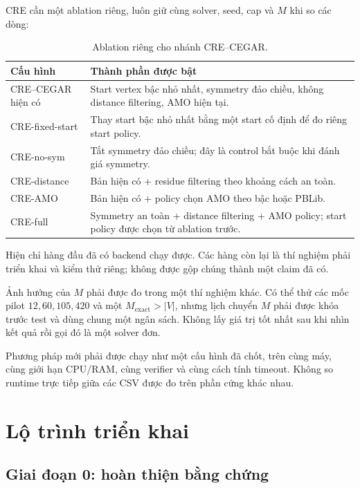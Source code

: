 \documentclass[11pt,a4paper,oneside]{scrreprt}
\begin{document}
\clearpage
CRE cần một ablation riêng, luôn giữ cùng solver, seed, cap và $M$ khi so các dòng:

\begin{table}[H]
\centering
\small
\begin{tabularx}{\textwidth}{p{31mm} X}
\toprule
Cấu hình & Thành phần được bật \\
\midrule
CRE--CEGAR hiện có & Start vertex bậc nhỏ nhất, symmetry đảo chiều, không distance filtering, AMO hiện tại. \\
CRE-fixed-start & Thay start bậc nhỏ nhất bằng một start cố định để đo riêng start policy. \\
CRE-no-sym & Tắt symmetry đảo chiều; đây là control bắt buộc khi đánh giá symmetry. \\
CRE-distance & Bản hiện có + residue filtering theo khoảng cách an toàn. \\
CRE-AMO & Bản hiện có + policy chọn AMO theo bậc hoặc PBLib. \\
CRE-full & Symmetry an toàn + distance filtering + AMO policy; start policy được chọn từ ablation trước. \\
\bottomrule
\end{tabularx}
\caption{Ablation riêng cho nhánh CRE--CEGAR.}
\end{table}

Hiện chỉ hàng đầu đã có backend chạy được. Các hàng còn lại là thí nghiệm phải triển khai và kiểm thử riêng; không được gộp chúng thành một claim đã có.

Ảnh hưởng của $M$ phải được đo trong một thí nghiệm khác. Có thể thử các mốc pilot $12,60,105,420$ và một $M_{\mathrm{exact}}>|V|$, nhưng lịch chuyển $M$ phải được khóa trước test và dùng chung một ngân sách. Không lấy giá trị tốt nhất sau khi nhìn kết quả rồi gọi đó là một solver đơn.

\begin{resultbox}
Phương pháp mới phải được chạy như một cấu hình đã chốt, trên cùng máy, cùng giới hạn CPU/RAM, cùng verifier và cùng cách tính timeout. Không so runtime trực tiếp giữa các CSV được đo trên phần cứng khác nhau.
\end{resultbox}

\chapter{Lộ trình triển khai}

\section{Giai đoạn 0: hoàn thiện bằng chứng}
\end{document}
